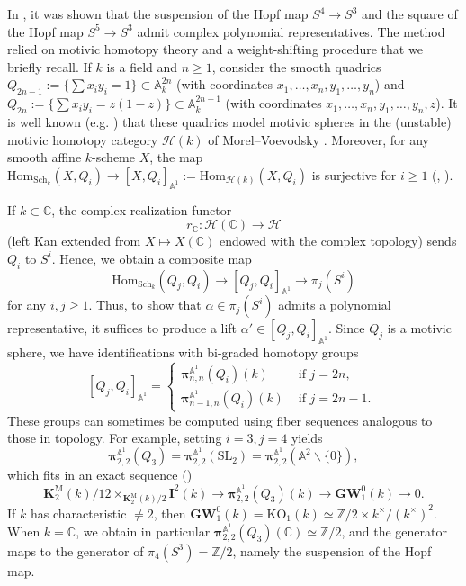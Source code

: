 \documentclass[11pt,leqno]{article}
\newcommand{\cplx}{{\mathbb C}}
\newcommand{\Z}{{\mathbb Z}}
\newcommand{\A}{{\mathbb A}}
\newcommand{\aone}{{\mathbb A}^1}
\renewcommand{\1}{{\rm 1\hspace*{-0.4ex}%
\rule{0.1ex}{1.52ex}\hspace*{0.2ex}}}
\newcommand{\bpi}{\bm{\pi}}
\newcommand{\piaone}{{\bpi}^{\aone}}
\newcommand{\KM}[1]{{{\mathbf K}_{#1}^{\mathrm{M}}}}
\newcommand{\<}[1]{{\langle}#1 {\rangle}}
\theoremstyle{plain}
\theoremstyle{definition}
\theoremstyle{remark}
\numberwithin{equation}{section}
\begin{document}
In \cite[Proposition 2.2.1]{Asok20b}, it was shown that the suspension of the Hopf map $S^4\to S^3$ and the square of the Hopf map $S^5\to S^3$ admit complex polynomial representatives. The method relied on motivic homotopy theory and a weight-shifting procedure that we briefly recall. If $k$ is a field and $n\geq 1$, consider the smooth quadrics $Q_{2n-1}:=\{\sum x_iy_i=1\}\subset \A^{2n}_k$ (with coordinates $x_1,\ldots,x_n,y_1,\ldots,y_n$) and $Q_{2n}:=\{\sum x_iy_i=z(1-z)\}\subset \A^{2n+1}_k$ (with coordinates $x_1,\ldots,x_n,y_1,\ldots,y_n,z$). It is well known (e.g. \cite{Asok14}) that these quadrics model motivic spheres in the (unstable) motivic homotopy category $\mathcal{H}(k)$ of Morel–Voevodsky \cite{Morel99}. Moreover, for any smooth affine $k$-scheme $X$, the map $\mathrm{Hom}_{\mathrm{Sch}_k}(X,Q_i)\to [X,Q_i]_{\A^1}:=\mathrm{Hom}_{\mathcal{H}(k)}(X,Q_i)$ is surjective for $i\geq 1$ (\cite[Theorem 4.2.1]{Asok15b}, \cite[Corollary 3.1.1]{Asok22}).

If $k\subset \cplx$, the complex realization functor \cite[\S 3.3]{Morel99}
\[
r_{\cplx}\colon \mathcal{H}(\cplx)\to \mathcal{H}
\]
(left Kan extended from $X\mapsto X(\cplx)$ endowed with the complex topology) sends $Q_i$ to $S^i$. Hence, we obtain a composite map
\[
\mathrm{Hom}_{\mathrm{Sch}_k}(Q_j,Q_i)\to [Q_j,Q_i]_{\A^1}\to \pi_j(S^i)
\]
for any $i,j\geq 1$. Thus, to show that $\alpha\in \pi_j(S^i)$ admits a polynomial representative, it suffices to produce a lift $\alpha'\in [Q_j,Q_i]_{\A^1}$. Since $Q_j$ is a motivic sphere, we have identifications with bi-graded homotopy groups
\[
[Q_j,Q_i]_{\A^1}=\begin{cases} \piaone_{n,n}(Q_i)(k) & \text{ if $j=2n$, }  \\ \piaone_{n-1,n}(Q_i)(k) & \text{ if $j=2n-1$. }\end{cases}
\]
These groups can sometimes be computed using fiber sequences analogous to those in topology. For example, setting $i=3,j=4$ yields
\[
\piaone_{2,2}(Q_3)=\piaone_{2,2}(\mathrm{SL}_2)=\piaone_{2,2}(\A^2\smallsetminus\{0\}),
\]
which fits in an exact sequence (\cite[Theorem 3.3, Proposition 4.4]{Asok12a})
\[
\KM 2(k)/12\times_{\KM 2(k)/2}\mathbf{I}^2(k)\to \piaone_{2,2}(Q_3)(k)\to \mathbf{GW}_1^0(k)\to 0.
\]
If $k$ has characteristic $\neq 2$, then $\mathbf{GW}_1^0(k)=\mathrm{KO}_1(k)\simeq \Z/2\times k^\times/(k^{\times})^2$. When $k=\cplx$, we obtain in particular $\piaone_{2,2}(Q_3)(\cplx)\simeq \Z/2$, and the generator maps to the generator of $\pi_4(S^3)=\Z/2$, namely the suspension of the Hopf map.
\end{document}
